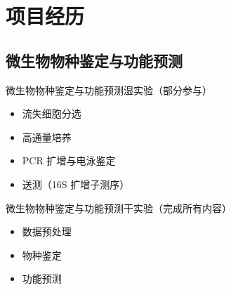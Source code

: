 \documentclass{beamer}
\begin{document}
	\section{项目经历}

	\subsection{微生物物种鉴定与功能预测}
	\begin{frame}{微生物物种鉴定与功能预测}{湿实验（部分参与）}
		\begin{itemize}
			\item 流失细胞分选
			\item 高通量培养
			\item PCR 扩增与电泳鉴定
			\item 送测（16S 扩增子测序）
		\end{itemize}
	\end{frame}

	\begin{frame}{微生物物种鉴定与功能预测}{干实验（完成所有内容）}
		\begin{itemize}
			\item 数据预处理
			\item 物种鉴定
			\item 功能预测
		\end{itemize}
	\end{frame}
\end{document}

